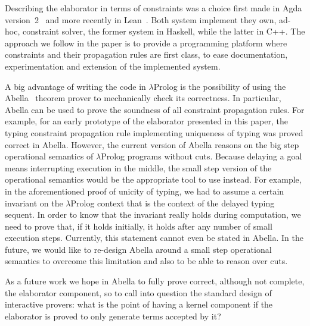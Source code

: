 \documentclass{easychair}
\begin{document}
Describing the elaborator in terms of constraints was a choice first 
made in Agda version~2~\cite{Agda} and more recently in Lean~\cite{Lean}.
Both system implement they own, ad-hoc, constraint solver, the former system in
Haskell, while the latter in C++.  The approach we follow in the paper
is to provide a programming platform where constraints and their propagation
rules are first class, to ease documentation, experimentation and extension
of the implemented system.

A big advantage of writing the code in $\lambda$Prolog is the possibility of
using the Abella~\cite{Abella} theorem prover to mechanically check
its correctness.
In particular, Abella can be used to prove the soundness of all constraint propagation rules. For example, for an early prototype of the elaborator presented
in this paper, the typing constraint propagation rule implementing uniqueness of
typing was proved correct in Abella. However, the current version of Abella reasons on the big step operational semantics of $\lambda$Prolog programs without cuts. Because delaying a goal means interrupting execution in the middle, the small step version of the operational semantics would be the appropriate tool to use instead. For example, in the aforementioned proof of unicity of typing, we had to assume a certain invariant on the $\lambda$Prolog context that is the context of the delayed typing sequent. In order to know that the invariant really holds during computation, we need to prove that, if it holds initially, it holds after any number of small execution steps. Currently, this statement cannot even be stated in Abella. In the future, we would like to re-design Abella around a small step operational semantics to overcome this limitation and also to be able to reason over cuts.

As a future work we hope in Abella to fully prove correct, although not complete, the
elaborator component, so to call into question the standard design of
interactive provers: what is the point of having a kernel component if the
elaborator is proved to only generate terms accepted by it?

\label{sect:bib}


\end{document}
